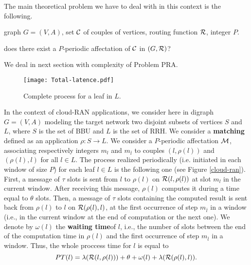 \documentclass{article}
\begin{document}
The main theoretical problem we have to deal with in this context is the following.\\


 graph $G=(V,A)$, set $\cal C$ of couples of vertices, routing function $\cal R$, integer $P$.

 does there exist a $P$-periodic affectation of $\cal C$ in $(G,{\cal R})$?

We deal in next section with complexity of Problem PRA.\\

 \begin{figure}[H]
\label{could-ran}
\begin{center}
\texttt{[image: Total-latence.pdf]}
\caption{Complete process for a leaf in $L$.}
\end{center}
\end{figure}

In the context of cloud-RAN applications, we consider here in digraph $G=(V,A)$ modeling the target network two disjoint subsets of vertices $S$ and $L$, where $S$ is the set of BBU and $L$ is the set of RRH. We consider a {\bf matching} defined as an application $\rho:S\rightarrow L$. We consider a $P$-periodic affectation $\cal M$, associating respectively integers $m_l$ and $m_{\overline l}$ to couples $(l,\rho(l))$ and $(\rho(l),l)$ for all $l \in L$. The process realized periodically (i.e. initiated in each window of size $P$) for each leaf $l \in L$ is the following one (see Figure \ref{cloud-ran}). First, a message of $\tau$ slots is sent from $l$ to $\rho(l)$ on ${\cal R}(l,\rho(l))$ at slot $m_l$ in the current window. After receiving this message, $\rho(l)$ computes it during a time equal to $\theta$ slots. Then, a message of $\tau$ slots containing the computed result is sent back from $\rho(l)$ to $l$ on ${\cal R}(\rho(l),l)$, at the first occurrence of  step $m_{\overline l}$ in a window (i.e., in the current window at the end of computation or the next one). We denote by $\omega(l)$ the {\bf waiting time}of $l$, i.e.,  the number of slots between the end of the computation time in $\rho(l)$ and the first occurrence of  step $m_{\overline l}$ in a window. Thus, the whole proccess time for $l$ is equal to
$$
PT(l)=\lambda({\cal R}(l,\rho(l)))+\theta+\omega(l)+\lambda({\cal R}(\rho(l),l)).
$$
  
\end{document}
